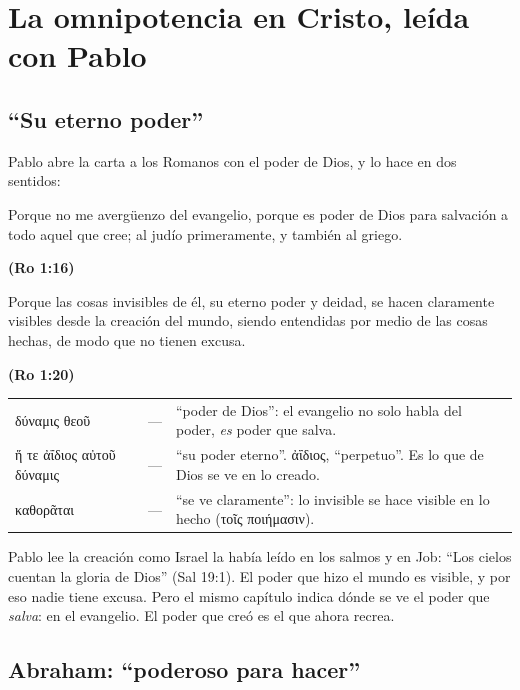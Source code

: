 \documentclass[11pt,letterpaper]{article}
\newcommand{\grc}[1]{\foreignlanguage{ancientgreek}{#1}}
\newcommand{\fuente}[1]{\par\hfill{\upshape\bfseries\small\textcolor{azul}{#1}}}
\begin{document}
\section{La omnipotencia en Cristo, leída con Pablo}\label{sec:cristo-omni}

\subsection{``Su eterno poder''}

Pablo abre la carta a los Romanos con el poder de Dios, y lo hace en dos sentidos:

\begin{cita}Porque no me avergüenzo del evangelio, porque es poder de Dios para salvación a todo aquel que cree; al judío primeramente, y también al griego.\fuente{(Ro 1:16)}\end{cita}

\begin{cita}Porque las cosas invisibles de él, su eterno poder y deidad, se hacen claramente visibles desde la creación del mundo, siendo entendidas por medio de las cosas hechas, de modo que no tienen excusa.\fuente{(Ro 1:20)}\end{cita}

\begin{filologia}[Ro 1:16, 20]
\begin{tabular}{@{}L{3.2cm}L{1.6cm}L{10cm}@{}}
\grc{δύναμις θεοῦ} & --- & ``poder de Dios'': el evangelio no solo habla del poder, \emph{es} poder que salva. \\[2pt]
\grc{ἥ τε ἀΐδιος αὐτοῦ δύναμις} & --- & ``su poder eterno''. \grc{ἀΐδιος}, ``perpetuo''. Es lo que de Dios se ve en lo creado. \\[2pt]
\grc{καθορᾶται} & --- & ``se ve claramente'': lo invisible se hace visible en lo hecho (\grc{τοῖς ποιήμασιν}). \\
\end{tabular}
\end{filologia}

Pablo lee la creación como Israel la había leído en los salmos y en Job: ``Los cielos cuentan la gloria de Dios'' (Sal 19:1). El poder que hizo el mundo es visible, y por eso nadie tiene excusa. Pero el mismo capítulo indica dónde se ve el poder que \emph{salva}: en el evangelio. El poder que creó es el que ahora recrea.

\subsection{Abraham: ``poderoso para hacer''}
\end{document}
